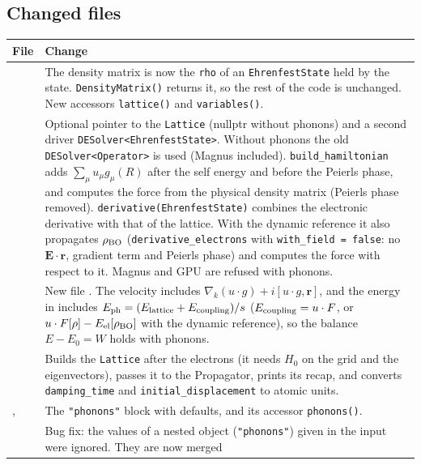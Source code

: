 \documentclass[11pt]{article}
\begin{document}
\subsection{Changed files}
\begin{center}
\small
\begin{tabularx}{\textwidth}{@{}>{\raggedright\arraybackslash}p{4.6cm}L@{}}
\toprule
File & Change \\
\midrule
{} &
The density matrix is now the \texttt{rho} of an \texttt{EhrenfestState} held by the state. \texttt{DensityMatrix()}
returns it, so the rest of the code is unchanged. New accessors \texttt{lattice()} and \texttt{variables()}. \\[2pt]
 &
Optional pointer to the \texttt{Lattice} (nullptr without phonons) and a second driver \texttt{DESolver<EhrenfestState>}.
Without phonons the old \texttt{DESolver<Operator>} is used (Magnus included). \texttt{build\_hamiltonian} adds
$\sum_\mu u_\mu g_\mu(R)$ after the self energy and before the Peierls phase, and computes the force from the physical
density matrix (Peierls phase removed). \texttt{derivative(EhrenfestState)} combines the electronic derivative with that
of the lattice. With the dynamic reference it also propagates $\rho_{\rm BO}$ (\texttt{derivative\_electrons} with
\texttt{with\_field = false}: no $\mathbf E\cdot\mathbf r$, gradient term and Peierls phase) and computes the force with
respect to it. Magnus and GPU are refused with phonons. \\[2pt]
 &
New file . The velocity includes $\nabla_k(u\cdot g)+i[u\cdot g,\mathbf r]$, and the energy in
 includes $E_{\rm ph}=(E_{\rm lattice}+E_{\rm coupling})/s$ ($E_{\rm coupling} = u\cdot F$, or
$u\cdot F[\rho]-E_{\rm el}[\rho_{\rm BO}]$ with the dynamic reference), so the balance $E-E_0=W$ holds with phonons. \\[2pt]
 &
Builds the \texttt{Lattice} after the electrons (it needs $H_0$ on the grid and the eigenvectors), passes it to the
Propagator, prints its recap, and converts \texttt{damping\_time} and \texttt{initial\_displacement} to atomic units. \\[2pt]
,  &
The \texttt{"phonons"} block with defaults, and its accessor \texttt{phonons()}. \\[2pt]
 &
Bug fix: the values of a nested object (\texttt{"phonons"}) given in the input were ignored. They are now merged

\end{tabularx}
\end{center}
\end{document}

